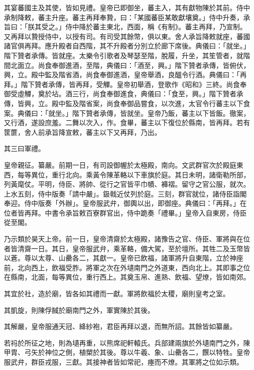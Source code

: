 \begin{pinyinscope}
 其宴蕃國主及其使，皆如見禮。皇帝已即御坐，蕃主入，其有獻物陳於其前。侍中承制降敕，蕃主升座。蕃主再拜奉贄，曰：「某國蕃臣某敢獻壤奠。」侍中升奏，承旨曰：「朕其受之。」侍中降於蕃主東北，西面，稱《有制》。蕃主再拜，乃宣制。又再拜以贄授侍中，以授有司。有司受其餘幣，俱以東。舍人承旨降敕就座，蕃國諸官俱再拜。應升殿者自西階，其不升殿者分別立於廊下席後。典儀曰：「就坐。」階下贊者承傳。皆就座。太樂令引歌者及琴瑟至階，脫履，升坐，其笙管者，就階間北面立。尚食奉御進酒，至階，典儀曰：「酒至，興。」階下贊者承傳，皆俯伏，興，立。殿中監及階省酒，尚食奉御進酒，皇帝舉酒，良醞令行酒。典儀曰：「再拜。」階下贊者承傳，皆再拜，受觶。皇帝初舉酒，登歌作《昭和》三終。尚食奉御受虛觶，奠於坫。酒三行，尚食奉御進食，典儀曰：「食至，興。」階下贊者承傳，皆興，立。殿中監及階省案，尚食奉御品嘗食，以次進，太官令行蕃主以下食案。典儀曰：「就坐。」階下贊者承傳，皆就坐。皇帝乃飯，蕃主以下皆飯。徹案，又行酒，遂設庶羞。二舞以次入，作。食畢，蕃主以下復位於縣南，皆再拜。若有筐篚，舍人前承旨降宣敕，蕃主以下又再拜，乃出。



 其三曰軍禮。



 皇帝親征。纂嚴。前期一日，有司設御幄於太極殿，南向。文武群官次於殿庭東西，每等異位，重行北向。乘黃令陳革輅以下車旗於庭。其日未明，諸衛勒所部，列黃麾仗。平明，侍臣、將帥、從行之官皆平巾幘、褲褶。留守之官公服，就次。上水五刻，侍中版奏「請中嚴」。鈒戟近仗列於庭。三刻，群官就位，諸侍臣詣閣奉迎。侍中版奏「外辦」。皇帝服武弁，御輿以出，即御座。典儀曰：「再拜。」在位者皆再拜。中書令承旨敕百寮群官出，侍中跪奏「禮畢。」皇帝入自東房，侍臣從至閣。



 乃示類於昊天上帝。前一日，皇帝清齋於太極殿，諸豫告之官、侍臣、軍將與在位者皆清齋一日。其日，皇帝服武弁，乘革輅，備大駕，至於壇所。其牲二及玉幣皆以蒼。尊以太尊、山罍各二，其獻一。皇帝已飲福，諸軍將升自東階，立於神座前，北向西上，飲福受胙。將軍之次在外壝南門之外道東，西向北上。其即事之位在縣南，北面，每等異位，重行西上。其奠玉帛、進熟、飲福、望燎，皆如南郊。



 其宜於社，造於廟，皆各如其禮而一獻。軍將飲福於太稷，廟則皇考之室。



 其凱旋，則陳俘馘於廟南門之外，軍實陳於其後。



 其解嚴，皇帝服通天冠、絳紗袍，君臣再拜以退，而無所詔。其餘皆如纂嚴。



 若祃於所征之地，則為壝再重，以熊席祀軒轅氏。兵部建兩旗於外壝南門之外，陳甲胄、弓矢於神位之側，植槊於其後。尊以牛羲、象、山罍各二，饌以特牲。皇帝服武弁，群臣戎服，三獻。其接神者皆如常祀，瘞而不燎。其軍將之位如示類。




\end{pinyinscope}
